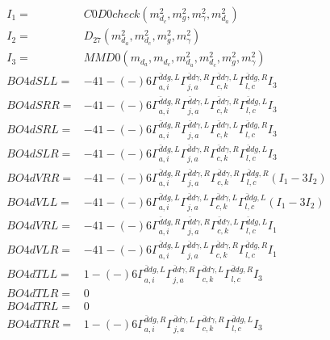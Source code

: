 \documentclass[A4,landscape]{article}
\begin{document}
\begin{align} 
I_1 = & C0D0check(m^2_{d_{{c}}}, m^2_{g}, m^2_{\gamma}, m^2_{d_{{a}}}) \\ 
I_2 = & D_{27}(m^2_{d_{{a}}}, m^2_{d_{{c}}}, m^2_{g}, m^2_{\gamma}) \\ 
I_3 = & MMD0(m_{d_{{a}}}, m_{d_{{c}}}, m^2_{d_{{a}}}, m^2_{d_{{c}}}, m^2_{g}, m^2_{\gamma}) \\ 
  BO4dSLL= & -4   1
-(-)
  6 \Gamma^{\bar{d}d g ,L}_{a, i} \Gamma^{\bar{d}d \gamma ,R}_{j, a} \Gamma^{\bar{d}d \gamma ,L}_{c, k} \Gamma^{\bar{d}d g ,R}_{l, c} I_3 \\ 
  BO4dSRR= & -4   1
-(-)
  6 \Gamma^{\bar{d}d g ,R}_{a, i} \Gamma^{\bar{d}d \gamma ,L}_{j, a} \Gamma^{\bar{d}d \gamma ,R}_{c, k} \Gamma^{\bar{d}d g ,L}_{l, c} I_3 \\ 
  BO4dSRL= & -4   1
-(-)
  6 \Gamma^{\bar{d}d g ,R}_{a, i} \Gamma^{\bar{d}d \gamma ,L}_{j, a} \Gamma^{\bar{d}d \gamma ,L}_{c, k} \Gamma^{\bar{d}d g ,R}_{l, c} I_3 \\ 
  BO4dSLR= & -4   1
-(-)
  6 \Gamma^{\bar{d}d g ,L}_{a, i} \Gamma^{\bar{d}d \gamma ,R}_{j, a} \Gamma^{\bar{d}d \gamma ,R}_{c, k} \Gamma^{\bar{d}d g ,L}_{l, c} I_3 \\ 
  BO4dVRR= & -4   1
-(-)
  6 \Gamma^{\bar{d}d g ,R}_{a, i} \Gamma^{\bar{d}d \gamma ,R}_{j, a} \Gamma^{\bar{d}d \gamma ,R}_{c, k} \Gamma^{\bar{d}d g ,R}_{l, c} (I_1 - 3 I_2) \\ 
  BO4dVLL= & -4   1
-(-)
  6 \Gamma^{\bar{d}d g ,L}_{a, i} \Gamma^{\bar{d}d \gamma ,L}_{j, a} \Gamma^{\bar{d}d \gamma ,L}_{c, k} \Gamma^{\bar{d}d g ,L}_{l, c} (I_1 - 3 I_2) \\ 
  BO4dVRL= & -4   1
-(-)
  6 \Gamma^{\bar{d}d g ,R}_{a, i} \Gamma^{\bar{d}d \gamma ,R}_{j, a} \Gamma^{\bar{d}d \gamma ,L}_{c, k} \Gamma^{\bar{d}d g ,L}_{l, c} I_1 \\ 
  BO4dVLR= & -4   1
-(-)
  6 \Gamma^{\bar{d}d g ,L}_{a, i} \Gamma^{\bar{d}d \gamma ,L}_{j, a} \Gamma^{\bar{d}d \gamma ,R}_{c, k} \Gamma^{\bar{d}d g ,R}_{l, c} I_1 \\ 
  BO4dTLL= &   1
-(-)
  6 \Gamma^{\bar{d}d g ,L}_{a, i} \Gamma^{\bar{d}d \gamma ,R}_{j, a} \Gamma^{\bar{d}d \gamma ,L}_{c, k} \Gamma^{\bar{d}d g ,R}_{l, c} I_3 \\ 
  BO4dTLR= & 0 \\ 
  BO4dTRL= & 0 \\ 
  BO4dTRR= &   1
-(-)
  6 \Gamma^{\bar{d}d g ,R}_{a, i} \Gamma^{\bar{d}d \gamma ,L}_{j, a} \Gamma^{\bar{d}d \gamma ,R}_{c, k} \Gamma^{\bar{d}d g ,L}_{l, c} I_3 \\ 
\end{align} 
\end{document}

